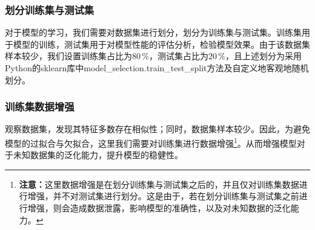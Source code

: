 \documentclass{MathorCupmodeling}
\begin{document}
	\subsubsection{划分训练集与测试集}
	对于模型的学习，我们需要对数据集进行划分，划分为训练集与测试集。训练集用于模型的训练，测试集用于对模型性能的评估分析，检验模型效果。由于该数据集样本较少，我们设置训练集占比为$80\,\%$，测试集占比为$20\,\%$，且上述划分为采用Python的sklearn库中model\_selection.train\_test\_split方法及自定义地客观地随机划分。

	\subsubsection{训练集数据增强}
	观察数据集，发现其特征多数存在相似性；同时，数据集样本较少。因此，为避免模型的过拟合与欠拟合，这里我们需要对训练集进行数据增强\textcolor{blue}{\footnote{\textbf{注意：}这里数据增强是在划分训练集与测试集之后的，并且仅对训练集数据进行增强，并不对测试集进行划分。这是由于，若在划分训练集与测试集之前进行增强，则会造成数据泄露，影响模型的准确性，以及对未知数据的泛化能力。}}。从而增强模型对于未知数据集的泛化能力，提升模型的稳健性。
\end{document}
